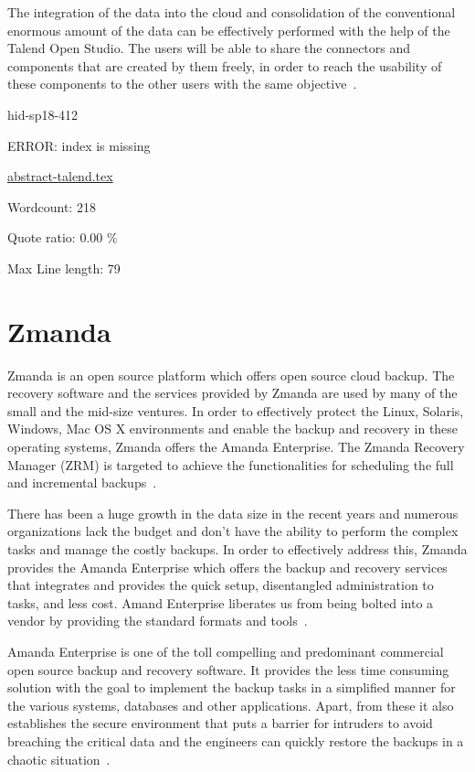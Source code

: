The integration of the data into the cloud and consolidation of the
conventional enormous amount of the data can be effectively performed
with the help of the Talend Open Studio. The users will be able to share
the connectors and components that are created by them freely,
in order to reach the usability of these components to the
other users with the same objective~\cite{hid-sp18-412-talend_products}.




\begin{IU}

hid-sp18-412

ERROR: index is missing

\href{https://github.com/cloudmesh-community/hid-sp18-412/blob/master//technology/abstract-talend.tex}{abstract-talend.tex}

 

Wordcount: 218


Quote ratio: 0.00 \%
 
Max Line length: 79
\end{IU}

\section{Zmanda}
Zmanda is an open source platform which offers open source cloud
backup.  The recovery software and the services provided by Zmanda are
used by many of the small and the mid-size ventures. In order to
effectively protect the Linux, Solaris, Windows, Mac OS X environments
and enable the backup and recovery in these operating systems, Zmanda
offers the Amanda Enterprise. The Zmanda Recovery Manager (ZRM) is
targeted to achieve the functionalities for scheduling the full and
incremental backups~\cite{hid-sp18-412-zmanda_crunchbase}.

There has been a huge growth in the data size in the recent years and
numerous organizations lack the budget and don't have the ability to
perform the complex tasks and manage the costly backups. In order to
effectively address this, Zmanda provides the Amanda Enterprise which
offers the backup and recovery services that integrates and provides
the quick setup, disentangled administration to tasks, and less
cost. Amand Enterprise liberates us from being bolted into a vendor by
providing the standard formats and
tools~\cite{hid-sp18-412-zmanda_amanda}.


Amanda Enterprise is one of the toll compelling and predominant
commercial open source backup and recovery software. It provides the
less time consuming solution with the goal to implement the backup
tasks in a simplified manner for the various systems, databases and
other applications. Apart, from these it also establishes the secure
environment that puts a barrier for intruders to avoid breaching the
critical data and the engineers can quickly restore the backups in a
chaotic situation~\cite{hid-sp18-412-zmanda_webinar}.



